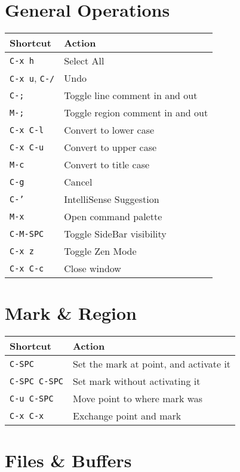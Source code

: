 \documentclass[10pt,landscape]{article}
\newcommand{\key}[1]{\textcolor{keycolor}{\texttt{#1}}}
\begin{document}
\begin{multicols}{2}
\section*{\textcolor{sectioncolor}{General Operations}}

\begin{tabular}{@{}p{3cm}p{6.5cm}@{}}
\toprule
\textbf{Shortcut} & \textbf{Action} \\
\midrule
\key{C-x h} & Select All \\
\key{C-x u}, \key{C-/} & Undo \\
\key{C-;} & Toggle line comment in and out \\
\key{M-;} & Toggle region comment in and out \\
\key{C-x C-l} & Convert to lower case \\
\key{C-x C-u} & Convert to upper case \\
\key{M-c} & Convert to title case \\
\key{C-g} & Cancel \\
\key{C-'} & IntelliSense Suggestion \\
\key{M-x} & Open command palette \\
\key{C-M-SPC} & Toggle SideBar visibility \\
\key{C-x z} & Toggle Zen Mode \\
\key{C-x C-c} & Close window \\
\bottomrule
\end{tabular}

\section*{\textcolor{sectioncolor}{Mark \& Region}}

\begin{tabular}{@{}p{3cm}p{6.5cm}@{}}
\toprule
\textbf{Shortcut} & \textbf{Action} \\
\midrule
\key{C-SPC} & Set the mark at point, and activate it \\
\key{C-SPC C-SPC} & Set mark without activating it \\
\key{C-u C-SPC} & Move point to where mark was \\
\key{C-x C-x} & Exchange point and mark \\
\bottomrule
\end{tabular}

\section*{\textcolor{sectioncolor}{Files \& Buffers}}


\end{multicols}
\end{document}
